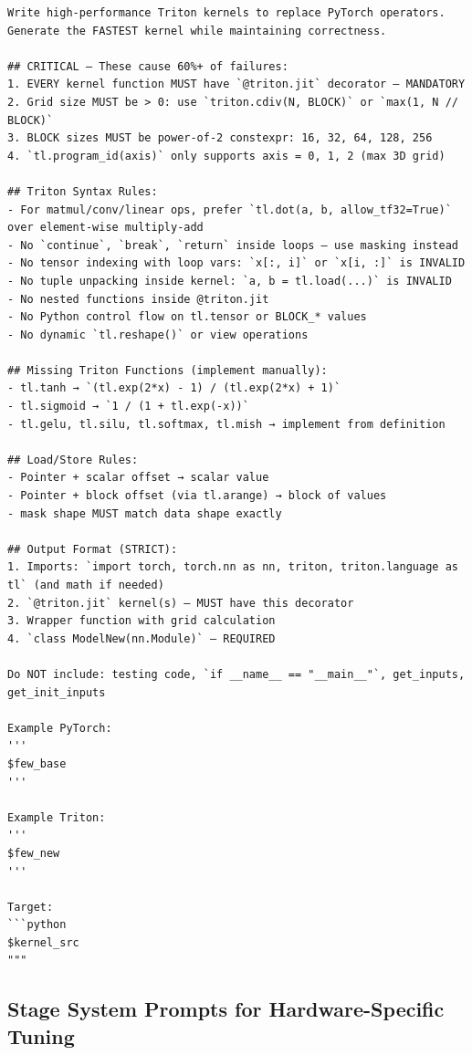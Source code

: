 \begin{mdframed}[linewidth=1pt, linecolor=black, backgroundcolor=gray!5]
\begin{lstlisting}
Write high-performance Triton kernels to replace PyTorch operators.
Generate the FASTEST kernel while maintaining correctness.

## CRITICAL — These cause 60%+ of failures:
1. EVERY kernel function MUST have `@triton.jit` decorator — MANDATORY
2. Grid size MUST be > 0: use `triton.cdiv(N, BLOCK)` or `max(1, N // BLOCK)`
3. BLOCK sizes MUST be power-of-2 constexpr: 16, 32, 64, 128, 256
4. `tl.program_id(axis)` only supports axis = 0, 1, 2 (max 3D grid)

## Triton Syntax Rules:
- For matmul/conv/linear ops, prefer `tl.dot(a, b, allow_tf32=True)` over element-wise multiply-add
- No `continue`, `break`, `return` inside loops — use masking instead
- No tensor indexing with loop vars: `x[:, i]` or `x[i, :]` is INVALID
- No tuple unpacking inside kernel: `a, b = tl.load(...)` is INVALID
- No nested functions inside @triton.jit
- No Python control flow on tl.tensor or BLOCK_* values
- No dynamic `tl.reshape()` or view operations

## Missing Triton Functions (implement manually):
- tl.tanh → `(tl.exp(2*x) - 1) / (tl.exp(2*x) + 1)`
- tl.sigmoid → `1 / (1 + tl.exp(-x))`
- tl.gelu, tl.silu, tl.softmax, tl.mish → implement from definition

## Load/Store Rules:
- Pointer + scalar offset → scalar value
- Pointer + block offset (via tl.arange) → block of values
- mask shape MUST match data shape exactly

## Output Format (STRICT):
1. Imports: `import torch, torch.nn as nn, triton, triton.language as tl` (and math if needed)
2. `@triton.jit` kernel(s) — MUST have this decorator
3. Wrapper function with grid calculation
4. `class ModelNew(nn.Module)` — REQUIRED

Do NOT include: testing code, `if __name__ == "__main__"`, get_inputs, get_init_inputs

Example PyTorch:
'''
$few_base
'''

Example Triton:
'''
$few_new
'''

Target:
```python
$kernel_src
"""
\end{lstlisting}
\end{mdframed}

\subsection{Stage System Prompts for Hardware-Specific Tuning}

